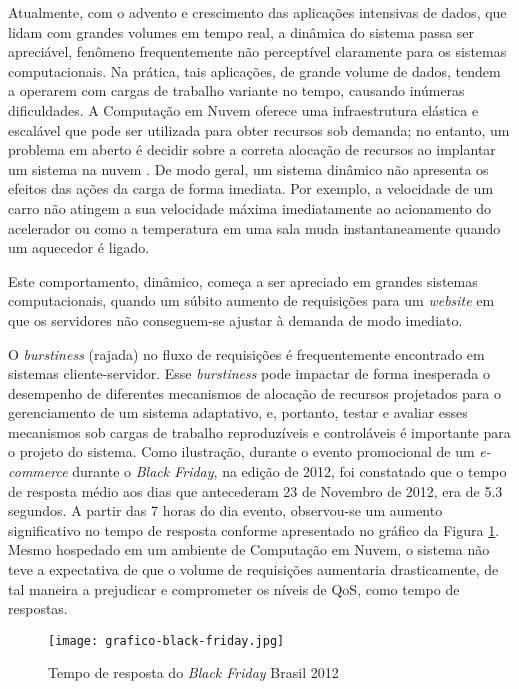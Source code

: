 Atualmente, com o advento e crescimento das aplicações intensivas de dados, que lidam com grandes volumes em tempo real, a dinâmica do sistema passa ser apreciável, fenômeno frequentemente não perceptível claramente para os sistemas computacionais. Na prática, tais aplicações, de grande volume de dados, tendem a operarem com cargas de trabalho variante no tempo, causando inúmeras dificuldades. A Computação em Nuvem oferece uma infraestrutura elástica e escalável que pode ser utilizada para obter recursos sob demanda; no entanto, um problema em aberto é decidir sobre a correta alocação de recursos ao implantar um sistema na nuvem \cite{Cervino2012}. De modo geral, um sistema dinâmico não apresenta os efeitos das ações da carga de forma imediata. Por exemplo, a velocidade de um carro não atingem a sua velocidade máxima imediatamente ao acionamento do acelerador ou como a temperatura em uma sala muda instantaneamente quando um aquecedor é ligado.

Este comportamento, dinâmico, começa a ser apreciado em grandes sistemas computacionais, quando um súbito aumento de requisições para um \textit{website} em que os servidores não conseguem-se ajustar à demanda de modo imediato. 

O \textit{burstiness} (rajada) no fluxo de requisições é frequentemente encontrado em sistemas cliente-servidor. Esse \textit{burstiness} pode impactar de forma inesperada o desempenho de diferentes mecanismos de alocação de recursos projetados para o gerenciamento de um sistema adaptativo, e, portanto, testar e avaliar esses mecanismos sob cargas de trabalho reproduzíveis e controláveis é importante para o projeto do sistema.  Como ilustração, durante o evento promocional de um \textit{e-commerce} durante o \textit{Black Friday}, na edição de 2012, foi constatado que o tempo de resposta médio aos dias que antecederam 23 de Novembro de 2012, era de 5.3 segundos. A partir das 7 horas do dia evento, observou-se um aumento significativo no tempo de resposta conforme apresentado no gráfico da Figura \ref{fig:grafico-black-friday}. Mesmo hospedado em um ambiente de Computação em Nuvem, o sistema não teve a expectativa de que o volume de requisições aumentaria drasticamente, de tal maneira a prejudicar e comprometer os níveis de QoS, como tempo de respostas.

\begin{figure}[htb]
	\centering
	\texttt{[image: grafico-black-friday.jpg]}
	\caption{Tempo de resposta do \textit{Black Friday} Brasil 2012}
	\label{fig:grafico-black-friday}
\end{figure}

